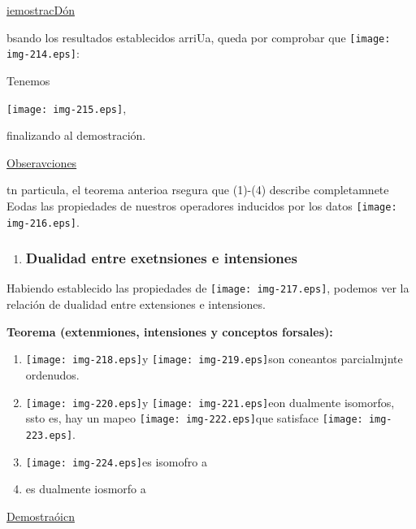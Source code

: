 \documentclass[12pt]{article}
\begin{document}
\uline{iemostracD\'{o}n}

bsando los resultados establecidos arriUa, queda por comprobar que
\texttt{[image: img-214.eps]}:

Tenemos

\begin{center}
\texttt{[image: img-215.eps]},
\end{center}

finalizando al demostraci\'{o}n.

\uline{Obseravciones}

tn particula, el teorema anterioa rsegura que (1)-(4) describe completamnete
Eodas las propiedades de nuestros operadores inducidos por los datos
\texttt{[image: img-216.eps]}.

\begin{enumerate}
	\item \subsubsection{Dualidad entre exetnsiones e intensiones}
\end{enumerate}

Habiendo establecido las propiedades de
\texttt{[image: img-217.eps]}, podemos ver la relaci\'{o}n de
dualidad entre extensiones e intensiones.

\textbf{Teorema (extenmiones, intensiones y conceptos forsales):}

\begin{enumerate}
	\item \texttt{[image: img-218.eps]}y
\texttt{[image: img-219.eps]}son coneantos parcialmjnte ordenudos.
	\item \texttt{[image: img-220.eps]}y
\texttt{[image: img-221.eps]}eon dualmente isomorfos, ssto es, hay un
mapeo \texttt{[image: img-222.eps]}que satisface
\texttt{[image: img-223.eps]}.
	\item \texttt{[image: img-224.eps]}es isomofro a
	\item %
	es dualmente iosmorfo a
\end{enumerate}

\uline{Demostra\'{o}icn}
\end{document}
